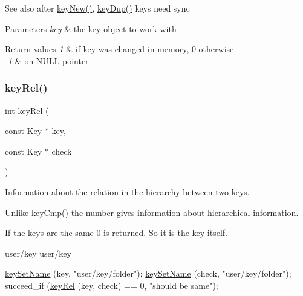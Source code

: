 \begin{DoxySeeAlso}{See also}
after \hyperlink{group__key_gad23c65b44bf48d773759e1f9a4d43b89}{key\+New()}, \hyperlink{group__key_gae6ec6a60cc4b8c1463fa08623d056ce3}{key\+Dup()} keys need sync
\end{DoxySeeAlso}

\begin{DoxyParams}{Parameters}
{\em key} & the key object to work with \\
\hline
\end{DoxyParams}

\begin{DoxyRetVals}{Return values}
{\em 1} & if {\ttfamily key} was changed in memory, 0 otherwise \\
\hline
{\em -\/1} & on N\+U\+LL pointer \\
\hline
\end{DoxyRetVals}
\mbox{\label{group__keytest_ga6bb0f95ac34ce9c42d61bb35a76139d0}} 
\subsubsection{\texorpdfstring{key\+Rel()}{keyRel()}}
{\footnotesize\ttfamily int key\+Rel (\begin{DoxyParamCaption}\item[{const Key $\ast$}]{key,  }\item[{const Key $\ast$}]{check }\end{DoxyParamCaption})}



Information about the relation in the hierarchy between two keys. 

Unlike \hyperlink{group__keytest_gaf6e66e12fe04d535a5d1c8218ced803e}{key\+Cmp()} the number gives information about hierarchical information.


\begin{DoxyItemize}
\item If the keys are the same 0 is returned. So it is the key itself. \begin{DoxyVerb}user/key
user/key
\end{DoxyVerb}

\end{DoxyItemize}


\begin{DoxyCode}
\hyperlink{group__keyname_ga7699091610e7f3f43d2949514a4b35d9}{keySetName} (key, \textcolor{stringliteral}{"user/key/folder"});
\hyperlink{group__keyname_ga7699091610e7f3f43d2949514a4b35d9}{keySetName} (check, \textcolor{stringliteral}{"user/key/folder"});
succeed\_if (\hyperlink{group__keytest_ga6bb0f95ac34ce9c42d61bb35a76139d0}{keyRel} (key, check) == 0, \textcolor{stringliteral}{"should be same"});
\end{DoxyCode}


